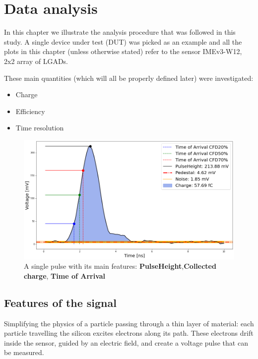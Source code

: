 \chapter{Data analysis}

In this chapter we illustrate the analysis procedure that was followed in this study. A single device under test (DUT) was picked as an example and all the plots in this chapter (unless otherwise stated) refer to the sensor  IMEv3-W12, 2x2 array of LGADs.

These main quantities (which will all be properly defined later) were investigated:

\begin{itemize}
    \item Charge
    \item Efficiency
    \item Time resolution
\end{itemize}


\begin{figure}[!hb]
    \centering
    \includegraphics[width=1\linewidth]{Images/plots_of_cuts/Waveform of particle, channel2, with CFD (ns).png}
    \caption{A single pulse with its main features: \textbf{PulseHeight},\textbf{Collected charge}, \textbf{Time of Arrival}}
    \label{fig:waveform_features}
\end{figure} 


\section{Features of the signal}\label{sec:signal_features}

Simplifying the physics  of a particle passing through a thin layer of material: each particle travelling the silicon excites electrons along its path. These electrons drift inside the sensor, guided by an electric field, and create a voltage pulse that can be measured.

